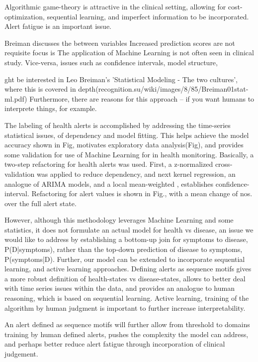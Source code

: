 \documentclass[12pt]{article}
\begin{document}
Algorithmic game-theory is attractive in the clinical setting, allowing for cost-optimization, sequential learning, and imperfect information to be incorporated.
Alert fatigue is an important issue.          

Breiman discusses the between variables Increased prediction scores are not requisite focus is The application of Machine Learning is not often seen in clinical study.  Vice-versa, issues such as confidence intervals, model structure,   

ght be interested in Leo Breiman's 'Statistical Modeling - The two cultures', where this is covered in depth(recognition.su/wiki/images/8/85/Breiman01stat-ml.pdf) Furthermore, there are reasons for this approach -- if you want humans to interprete things, for example.

The labeling of health alerts is accomplished by addressing the time-series statistical issues, of dependency and model fitting.  This helps achieve the model accuracy shown in Fig, motivates exploratory data analysis(Fig), and provides some validation for use of Machine Learning for in health monitoring.  Basically, a two-step refactoring for health alerts was used.  First, a z-normalized cross-validation was applied to reduce dependency, and next kernel regression, an analogue of ARIMA models, and a local mean-weighted , establishes confidence-interval.  Refactoring for alert values is shown in Fig., with a mean change of nos. over the full alert state.  

   However, although this methodology leverages Machine Learning and some statistics, it does not formulate an actual model for health vs disease, an issue we would like to address by establishing a bottom-up join for symptoms to disease, P(D|symptoms), rather than the top-down prediction of disease to symptoms, P(symptoms|D).  Further, our model can be extended to incorporate sequential learning, and active learning approaches.  Defining alerts as sequence motifs gives a more robust definition of health-states vs disease-states, allows to better deal with time series issues within the data, and provides an analogue to human reasoning, which is based on sequential learning.  Active learning, training of the algorithm by human judgment is important to further increase interpretability.

  An alert defined as sequence motifs will further allow from threshold to  domains training by human defined alerts, pushes the complexity the model can address, and perhaps better reduce alert fatigue through incorporation of clinical judgement.
\end{document}
